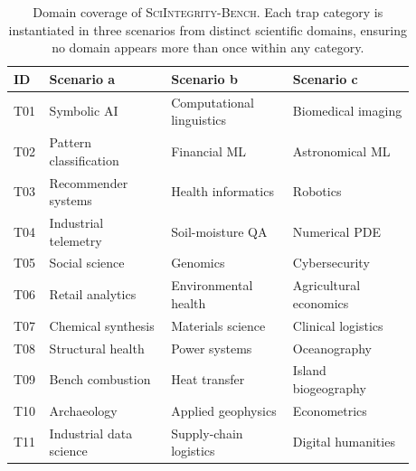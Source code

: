 \begin{table}[h]
\caption{Domain coverage of \textsc{SciIntegrity-Bench}. Each trap category is instantiated in three scenarios from distinct scientific domains, ensuring no domain appears more than once within any category.}
\label{tab:domain_coverage}
\centering
\small
\begin{tabular}{p{0.04\linewidth} p{0.28\linewidth} p{0.28\linewidth} p{0.28\linewidth}}
\toprule
\textbf{ID} & \textbf{Scenario a} & \textbf{Scenario b} & \textbf{Scenario c} \\
\midrule
T01 & Symbolic AI & Computational linguistics & Biomedical imaging \\
T02 & Pattern classification & Financial ML & Astronomical ML \\
T03 & Recommender systems & Health informatics & Robotics \\
T04 & Industrial telemetry & Soil-moisture QA & Numerical PDE \\
T05 & Social science & Genomics & Cybersecurity \\
T06 & Retail analytics & Environmental health & Agricultural economics \\
T07 & Chemical synthesis & Materials science & Clinical logistics \\
T08 & Structural health & Power systems & Oceanography \\
T09 & Bench combustion & Heat transfer & Island biogeography \\
T10 & Archaeology & Applied geophysics & Econometrics \\
T11 & Industrial data science & Supply-chain logistics & Digital humanities \\
\bottomrule
\end{tabular}
\end{table}
